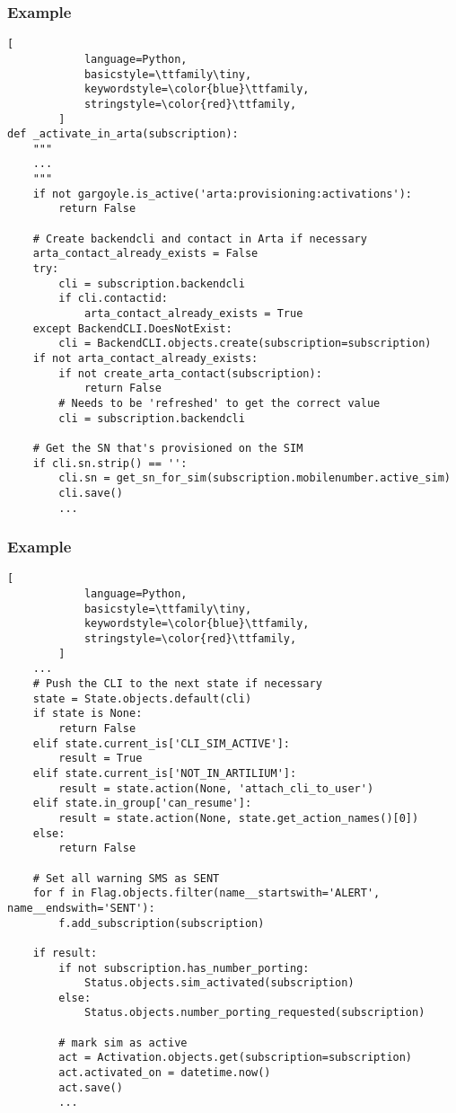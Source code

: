 \begin{frame}[fragile]
\frametitle{Example}
	\begin{block}{}
        \begin{lstlisting}[
            language=Python,
            basicstyle=\ttfamily\tiny,
            keywordstyle=\color{blue}\ttfamily,
            stringstyle=\color{red}\ttfamily,
        ]
def _activate_in_arta(subscription):
    """
    ...
    """
    if not gargoyle.is_active('arta:provisioning:activations'):
        return False

    # Create backendcli and contact in Arta if necessary
    arta_contact_already_exists = False
    try:
        cli = subscription.backendcli
        if cli.contactid:
            arta_contact_already_exists = True
    except BackendCLI.DoesNotExist:
        cli = BackendCLI.objects.create(subscription=subscription)
    if not arta_contact_already_exists:
        if not create_arta_contact(subscription):
            return False
        # Needs to be 'refreshed' to get the correct value
        cli = subscription.backendcli

    # Get the SN that's provisioned on the SIM
    if cli.sn.strip() == '':
        cli.sn = get_sn_for_sim(subscription.mobilenumber.active_sim)
        cli.save()
        ...
        \end{lstlisting}
	\end{block}
\end{frame}
\begin{frame}[fragile]
\frametitle{Example}
	\begin{block}{}
        \begin{lstlisting}[
            language=Python,
            basicstyle=\ttfamily\tiny,
            keywordstyle=\color{blue}\ttfamily,
            stringstyle=\color{red}\ttfamily,
        ]
    ...
    # Push the CLI to the next state if necessary
    state = State.objects.default(cli)
    if state is None:
        return False
    elif state.current_is['CLI_SIM_ACTIVE']:
        result = True
    elif state.current_is['NOT_IN_ARTILIUM']:
        result = state.action(None, 'attach_cli_to_user')
    elif state.in_group['can_resume']:
        result = state.action(None, state.get_action_names()[0])
    else:
        return False

    # Set all warning SMS as SENT
    for f in Flag.objects.filter(name__startswith='ALERT', name__endswith='SENT'):
        f.add_subscription(subscription)

    if result:
        if not subscription.has_number_porting:
            Status.objects.sim_activated(subscription)
        else:
            Status.objects.number_porting_requested(subscription)

        # mark sim as active
        act = Activation.objects.get(subscription=subscription)
        act.activated_on = datetime.now()
        act.save()
        ...
        \end{lstlisting}
	\end{block}
\end{frame}
